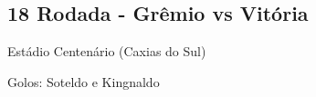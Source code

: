 \newpage
\subsection{18 Rodada - Grêmio vs Vitória}

\begin{figure}[H]
    \centering
    
\end{figure}

Estádio Centenário (Caxias do Sul)

Golos: Soteldo e Kingnaldo